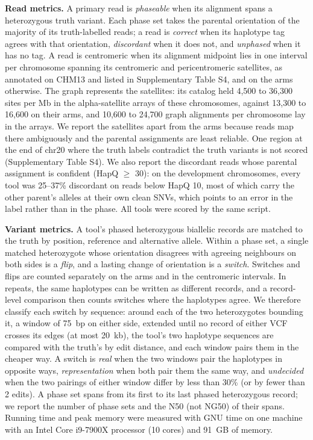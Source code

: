 \textbf{Read metrics.} A primary read is \emph{phaseable} when its alignment spans a heterozygous truth variant. Each phase set takes the parental orientation of the majority of its truth-labelled reads; a read is \emph{correct} when its haplotype tag agrees with that orientation, \emph{discordant} when it does not, and \emph{unphased} when it has no tag. A read is centromeric when its alignment midpoint lies in one interval per chromosome spanning its centromeric and pericentromeric satellites, as annotated on CHM13 \citep{Altemose2022} and listed in Supplementary Table S4, and on the arms otherwise. The graph represents the satellites: its catalog held 4{,}500 to 36{,}300 sites per Mb in the alpha-satellite arrays of these chromosomes, against 13{,}300 to 16{,}600 on their arms, and 10{,}600 to 24{,}700 graph alignments per chromosome lay in the arrays. We report the satellites apart from the arms because reads map there ambiguously and the parental assignments are least reliable. One region at the end of chr20 where the truth labels contradict the truth variants is not scored (Supplementary Table S4). We also report the discordant reads whose parental assignment is confident (HapQ $\ge$ 30): on the development chromosomes, every tool was 25--37\% discordant on reads below HapQ 10, most of which carry the other parent's alleles at their own clean SNVs, which points to an error in the label rather than in the phase. All tools were scored by the same script.

\textbf{Variant metrics.} A tool's phased heterozygous biallelic records are matched to the truth by position, reference and alternative allele. Within a phase set, a single matched heterozygote whose orientation disagrees with agreeing neighbours on both sides is a \emph{flip}, and a lasting change of orientation is a \emph{switch}. Switches and flips are counted separately on the arms and in the centromeric intervals. In repeats, the same haplotypes can be written as different records, and a record-level comparison then counts switches where the haplotypes agree. We therefore classify each switch by sequence: around each of the two heterozygotes bounding it, a window of 75~bp on either side, extended until no record of either VCF crosses its edges (at most 20~kb), the tool's two haplotype sequences are compared with the truth's by edit distance, and each window pairs them in the cheaper way. A switch is \emph{real} when the two windows pair the haplotypes in opposite ways, \emph{representation} when both pair them the same way, and \emph{undecided} when the two pairings of either window differ by less than 30\% (or by fewer than 2 edits). A phase set spans from its first to its last phased heterozygous record; we report the number of phase sets and the N50 (not NG50) of their spans. Running time and peak memory were measured with GNU time on one machine with an Intel Core i9-7900X processor (10 cores) and 91~GB of memory.

